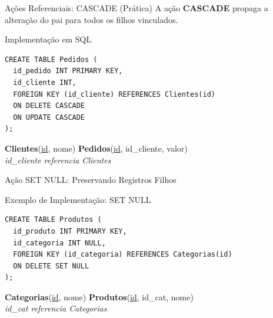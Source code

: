 \documentclass[9pt]{beamer}
\begin{document}
\begin{frame}[fragile]{Ações Referenciais: CASCADE (Prática)}
  \small
  A ação \textbf{CASCADE} propaga a alteração do pai para todos os filhos vinculados.
  \vspace{0.3cm}
  \begin{exampleblock}{Implementação em SQL}
\begin{lstlisting}
CREATE TABLE Pedidos (
  id_pedido INT PRIMARY KEY,
  id_cliente INT,
  FOREIGN KEY (id_cliente) REFERENCES Clientes(id)
  ON DELETE CASCADE
  ON UPDATE CASCADE
);
\end{lstlisting}
  \end{exampleblock}
  \vspace{0.3cm}
  \centering
  \centering\scriptsize
  \textbf{Clientes}(\underline{id}, nome) \quad \textbf{Pedidos}(\underline{id}, \color{red}id\_cliente\color{black}, valor) \\
  \textit{id\_cliente referencia Clientes}
\end{frame}

\begin{frame}[fragile]{Ação SET NULL: Preservando Registros Filhos}
  \begin{exampleblock}{Exemplo de Implementação: SET NULL}
\begin{lstlisting}
CREATE TABLE Produtos (
  id_produto INT PRIMARY KEY,
  id_categoria INT NULL,
  FOREIGN KEY (id_categoria) REFERENCES Categorias(id)
  ON DELETE SET NULL
);
\end{lstlisting}
  \end{exampleblock}
  \vspace{0.2cm}
  \centering
  \centering\scriptsize
  \textbf{Categorias}(\underline{id}, nome) \quad \textbf{Produtos}(\underline{id}, \color{red}id\_cat\color{black}, nome) \\
  \textit{id\_cat referencia Categorias}
\end{frame}
\end{document}
